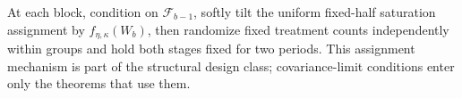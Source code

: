 At each block, condition on \(\mathcal F_{b-1}\), softly tilt the uniform fixed-half saturation assignment by \(f_{\eta,\kappa}(W_b)\), then randomize fixed treatment counts independently within groups and hold both stages fixed for two periods.  This assignment mechanism is part of the structural design class; covariance-limit conditions enter only the theorems that use them.